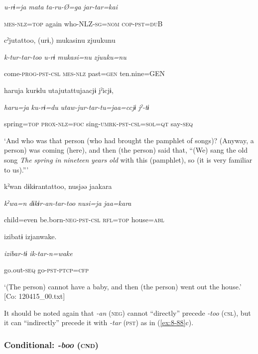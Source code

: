       \textit{u-rɨ=ja}  \textit{mata}  \textit{ta-ru-Ø=ga}  \textit{jar-tar=kai}

      \textsc{mes}-\textsc{nlz}=\textsc{top}  again  who-NLZ-\textsc{sg}=\textsc{nom}  \textsc{cop}-\textsc{pst}=\textsc{du}B

      cˀjutattoo,  (urɨ,)  mukasinu  {\textbar}zjuukunu

      \textit{k-tur-tar-too}  \textit{u-rɨ}  \textit{mukasi=nu}  \textit{zjuuku=nu}

      come-\textsc{prog}-\textsc{pst}-\textsc{csl}  \textsc{mes}-\textsc{nlz}  past=\textsc{gen}  ten.nine=GEN

      haru{\textbar}ja  kurɨdu  utajutattujaacjɨ  jˀicjɨ,

      \textit{haru=ja}  \textit{ku-rɨ=du}  \textit{utaw-jur-tar-tu=jaa=ccjɨ}  \textit{jˀ-tɨ}

      spring=\textsc{top}  \textsc{prox}-\textsc{nlz}=\textsc{foc}  sing-\textsc{umrk}-\textsc{pst}-\textsc{csl}=\textsc{sol}=\textsc{qt}  say-\textsc{seq}

\glt ‘And who was that person (who had brought the pamphlet of songs)? (Anyway, a person) was coming (here), and then (the person) said that, “(We) sang the old song \textit{The} \textit{spring} \textit{in} \textit{nineteen} \textit{years} \textit{old} with this (pamphlet), so (it is very familiar to us).”’

\ex {\TM}
\glll  kˀwan  dɨkɨrantattoo,  nusjəə  jaakara

      \textit{kˀwa=n}  \textit{dɨkɨr-an-tar-too}  \textit{nusi=ja}  \textit{jaa=kara}

      child=even  be.born-\textsc{neg}-\textsc{pst}-\textsc{csl}  \textsc{rfl}=\textsc{top}  house=\textsc{abl}

      izibatɨ  izjanwake.

      \textit{izibar-tɨ}  \textit{ik-tar-n=wake}

      go.out-\textsc{seq}  go-\textsc{pst}-\textsc{ptcp}=\textsc{cfp}

\glt ‘(The person) cannot have a baby, and then (the person) went out the house.’ [Co: 120415\_00.txt]
\z

It should be noted again that \textit{-an} (\textsc{neg}) cannot “directly” precede \textit{{}-too} (\textsc{csl}), but it can “indirectly” precede it with \textit{{}-tar} (\textsc{pst}) as in (\ref{ex:8-88}c).

\subsubsection{Conditional: \textit{{}-boo} (\textsc{cnd})}

